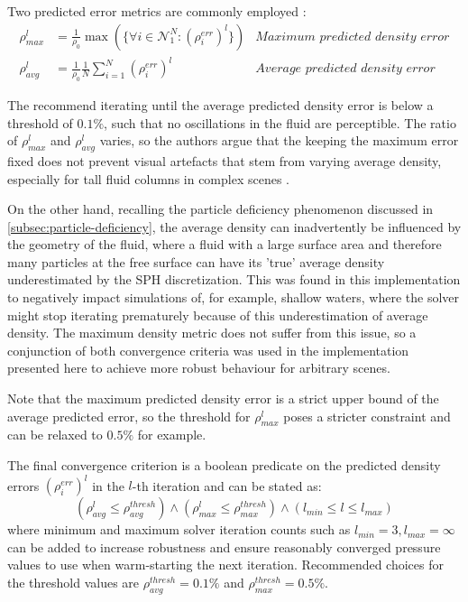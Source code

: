 \documentclass[oneside, a4paper]{book}
\newcommand\br[1]{\left(#1\right)}
\begin{document}
  Two predicted error metrics are commonly employed \autocite{iisph}:
  \begin{align}
    \rho^{l}_{max} &= \frac{1}{\rho_0}\max\br{\{\forall i\in\mathcal{N}_1^N: \br{\rho^{err}_i}^l\}} 
    &\textit{Maximum predicted density error}\\
    \rho^{l}_{avg} &= \frac{1}{\rho_0}\frac{1}{N}\sum_{i=1}^N \br{\rho^{err}_i}^l
    &\textit{Average predicted density error}
  \end{align}

  The \autocite[authors of IISPH]{iisph} recommend iterating until the average predicted density error is below a threshold of $0.1\%$, such that no oscillations in the fluid are perceptible. The ratio of $\rho^{l}_{max}$ and $\rho^{l}_{avg}$ varies, so the authors argue that the keeping the maximum error fixed does not prevent visual artefacts that stem from varying average density, especially for tall fluid columns in complex scenes \autocite{iisph}. 
  
  On the other hand, recalling the particle deficiency phenomenon discussed in \autoref{subsec:particle-deficiency}, the average density can inadvertently be influenced by the geometry of the fluid, where a fluid with a large surface area and therefore many particles at the free surface can have its 'true' average density underestimated by the SPH discretization. This was found in this implementation to negatively impact simulations of, for example, shallow waters, where the solver might stop iterating prematurely because of this underestimation of average density. The maximum density metric does not suffer from this issue, so a conjunction of both convergence criteria was used in the implementation presented here to achieve more robust behaviour for arbitrary scenes. 

  Note that the maximum predicted density error is a strict upper bound of the average predicted error, so the threshold for $\rho^{l}_{max}$ poses a stricter constraint and can be relaxed to $0.5\%$ for example.

  The final convergence criterion is a boolean predicate on the predicted density errors $\br{\rho_i^{err}}^l$ in the $l$-th iteration and can be stated as:
  \begin{equation}
    \br{\rho^l_{avg} \leq \rho^{thresh}_{avg}}
    \land \br{\rho^l_{max} \leq \rho^{thresh}_{max}}
    \land \br{l_{min} \leq l \leq l_{max}}
    \label{eq:convergence-criterion}
  \end{equation}
  where minimum and maximum solver iteration counts such as $l_{min}=3, l_{max}=\infty$ can be added to increase robustness and ensure reasonably converged pressure values to use when warm-starting the next iteration. Recommended choices for the threshold values are $\rho^{thresh}_{avg}=0.1\%$ \autocite{iisph} and $\rho^{thresh}_{max}=0.5\%$.
\end{document}
